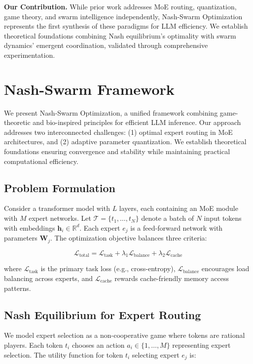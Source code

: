 \documentclass[11pt]{article}
\begin{document}
\textbf{Our Contribution.} While prior work addresses MoE routing, quantization, game theory, and swarm intelligence independently, Nash-Swarm Optimization represents the first synthesis of these paradigms for LLM efficiency. We establish theoretical foundations combining Nash equilibrium's optimality with swarm dynamics' emergent coordination, validated through comprehensive experimentation.

\section{Nash-Swarm Framework}
\label{sec:method}

We present Nash-Swarm Optimization, a unified framework combining game-theoretic and bio-inspired principles for efficient LLM inference. Our approach addresses two interconnected challenges: (1) optimal expert routing in MoE architectures, and (2) adaptive parameter quantization. We establish theoretical foundations ensuring convergence and stability while maintaining practical computational efficiency.

\subsection{Problem Formulation}

Consider a transformer model with $L$ layers, each containing an MoE module with $M$ expert networks. Let $\mathcal{T} = \{t_1, \ldots, t_N\}$ denote a batch of $N$ input tokens with embeddings $\mathbf{h}_i \in \mathbb{R}^d$. Each expert $e_j$ is a feed-forward network with parameters $\mathbf{W}_j$. The optimization objective balances three criteria:

\begin{equation}
\mathcal{L}_{\text{total}} = \mathcal{L}_{\text{task}} + \lambda_1 \mathcal{L}_{\text{balance}} + \lambda_2 \mathcal{L}_{\text{cache}}
\end{equation}

where $\mathcal{L}_{\text{task}}$ is the primary task loss (e.g., cross-entropy), $\mathcal{L}_{\text{balance}}$ encourages load balancing across experts, and $\mathcal{L}_{\text{cache}}$ rewards cache-friendly memory access patterns.

\subsection{Nash Equilibrium for Expert Routing}

We model expert selection as a non-cooperative game where tokens are rational players. Each token $t_i$ chooses an action $a_i \in \{1, \ldots, M\}$ representing expert selection. The utility function for token $t_i$ selecting expert $e_j$ is:
\end{document}
